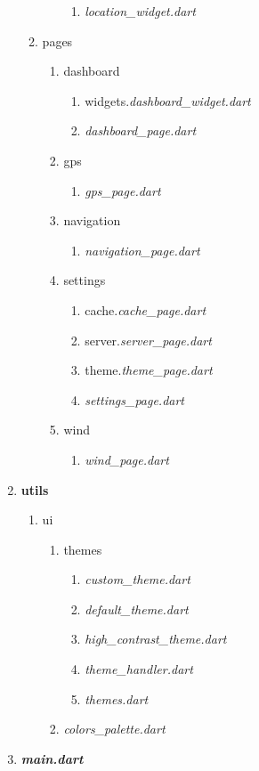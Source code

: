 \begin{enumerate}
\begin{enumerate}
\begin{enumerate}
\begin{enumerate}
							\item \textit{location\_widget.dart}
						\end{enumerate}
				\end{enumerate}
			\item pages
				\begin{enumerate}
					\item dashboard
						\begin{enumerate}
							\item widgets.\textit{dashboard\_widget.dart}
							\item \textit{dashboard\_page.dart}
						\end{enumerate}
					\item gps
						\begin{enumerate}
							\item \textit{gps\_page.dart}
						\end{enumerate}
					\item navigation
						\begin{enumerate}
							\item \textit{navigation\_page.dart}
						\end{enumerate}
					\item settings
						\begin{enumerate}
							\item cache.\textit{cache\_page.dart}
							\item server.\textit{server\_page.dart}
							\item theme.\textit{theme\_page.dart}
							\item \textit{settings\_page.dart}
						\end{enumerate}
					\item wind
						\begin{enumerate}
							\item \textit{wind\_page.dart}
						\end{enumerate}
				\end{enumerate}
		\end{enumerate}
	\item \textbf{utils}
		\begin{enumerate}
			\item ui
				\begin{enumerate}
					\item themes
						\begin{enumerate}
							\item \textit{custom\_theme.dart}
							\item \textit{default\_theme.dart}
							\item \textit{high\_contrast\_theme.dart}
							\item \textit{theme\_handler.dart}
							\item \textit{themes.dart}
						\end{enumerate}
					\item \textit{colors\_palette.dart}
				\end{enumerate}
		\end{enumerate}
	\item \textbf{\textit{main.dart}}
\end{enumerate}

